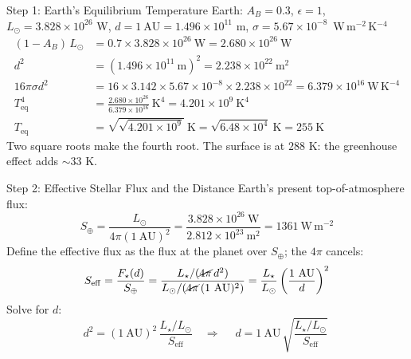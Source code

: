 \documentclass[aspectratio=169, 11pt]{beamer}
\begin{document}
\begin{frame}{Step 1: Earth's Equilibrium Temperature}
  \small
  Earth: $A_B = 0.3$, $\epsilon = 1$, $L_\odot = 3.828 \times 10^{26}$ W, $d = 1\ \mathrm{AU} = 1.496 \times 10^{11}$ m, \mbox{$\sigma = 5.67 \times 10^{-8}$ W\,m$^{-2}$\,K$^{-4}$}
  \[
    \begin{aligned}
      (1 - A_B)\,L_\odot &= 0.7 \times 3.828 \times 10^{26}\ \mathrm{W} = 2.680 \times 10^{26}\ \mathrm{W} \\
      d^2 &= (1.496 \times 10^{11}\ \mathrm{m})^2 = 2.238 \times 10^{22}\ \mathrm{m^2} \\
      16\pi\sigma d^2 &= 16 \times 3.142 \times 5.67 \times 10^{-8} \times 2.238 \times 10^{22} = 6.379 \times 10^{16}\ \mathrm{W\,K^{-4}} \\
      T_{\mathrm{eq}}^4 &= \frac{2.680 \times 10^{26}}{6.379 \times 10^{16}}\ \mathrm{K^4} = 4.201 \times 10^{9}\ \mathrm{K^4} \\
      T_{\mathrm{eq}} &= \sqrt{\sqrt{4.201 \times 10^{9}}}\ \mathrm{K} = \sqrt{6.48 \times 10^{4}}\ \mathrm{K} = 255\ \mathrm{K}
    \end{aligned}
  \]
  Two square roots make the fourth root. The surface is at $288$ K: the greenhouse effect adds $\sim 33$ K.
  \vskip4pt
\end{frame}

\begin{frame}{Step 2: Effective Stellar Flux and the Distance}
  \small
  Earth's present top-of-atmosphere flux:
  \[
    S_\oplus = \frac{L_\odot}{4\pi (1\ \mathrm{AU})^2} = \frac{3.828 \times 10^{26}\ \mathrm{W}}{2.812 \times 10^{23}\ \mathrm{m^2}} = 1361\ \mathrm{W\,m^{-2}}
  \]
  Define the effective flux as the flux at the planet over $S_\oplus$; the $4\pi$ cancels:
  \[
    S_{\mathrm{eff}} = \frac{F_\star(d)}{S_\oplus} = \frac{L_\star/(\cancel{4\pi}\,d^2)}{L_\odot/(\cancel{4\pi}\,(1\ \mathrm{AU})^2)} = \frac{L_\star}{L_\odot}\left(\frac{1\ \mathrm{AU}}{d}\right)^{2}
  \]
  Solve for $d$:
  \[
    d^2 = (1\ \mathrm{AU})^2\,\frac{L_\star/L_\odot}{S_{\mathrm{eff}}}
    \quad\Rightarrow\quad
    \boxed{\;d = 1\ \mathrm{AU}\,\sqrt{\frac{L_\star/L_\odot}{S_{\mathrm{eff}}}}\;}
  \]
\end{frame}
\end{document}
